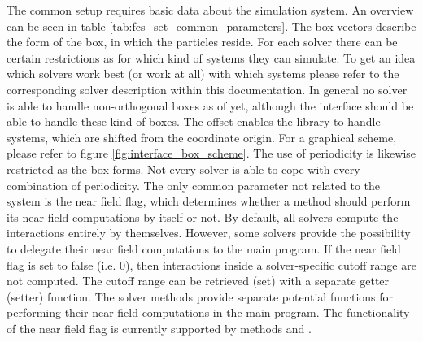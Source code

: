 The common setup requires basic data about the simulation system. An overview can be seen in table \ref{tab:fcs_set_common_parameters}. The box vectors
describe the form of the box, in which the particles reside. For each solver there can be certain restrictions as for which kind of systems they can simulate. 
To get an idea which solvers work best (or work at all) with which systems please refer to the corresponding solver description within this documentation.
In general no solver is able to handle non-orthogonal boxes as of yet, although the interface should be able to handle these kind of boxes. The offset
enables the library to handle systems, which are shifted from the coordinate origin. For a graphical scheme, please refer to figure \ref{fig:interface_box_scheme}.
The use of periodicity is likewise restricted as the box forms. Not every solver is able to cope with every combination of periodicity. The only
common parameter not related to the system is the near field flag, which determines whether a method should perform its near field computations by itself or not.
By default, all solvers compute the interactions entirely by themselves. However, some solvers provide the possibility to delegate their near field 
computations to the main program. If the near field flag is set to false (i.e. 0), then interactions inside a solver-specific cutoff range are not computed.
The cutoff range can be retrieved (set) with a separate getter (setter) function. The solver methods provide separate potential functions for performing their
near field computations in the main program. The functionality of the near field flag is currently supported by methods \pthreem and \ptwonfft.

